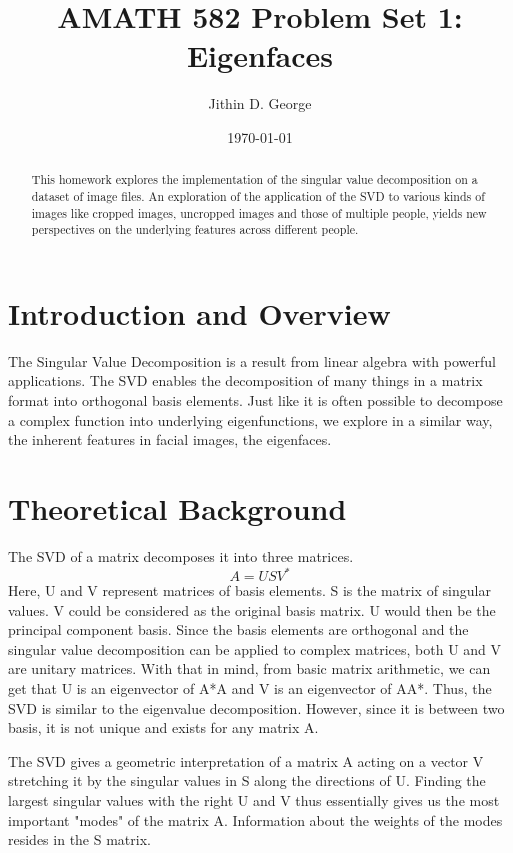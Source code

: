 \documentclass[a4paper]{article}
\title{AMATH 582 Problem Set 1: Eigenfaces}
\author{Jithin D. George}
\date{\today}
\begin{document}
\maketitle

\begin{abstract}
This homework explores the implementation of the singular value decomposition on a dataset of image files. An exploration of the application of the SVD to various kinds of images like cropped images, uncropped images and those of multiple people, yields new perspectives on the underlying features across different people.
\end{abstract}

\section{Introduction and Overview}
\label{sec:introduction}

The Singular Value Decomposition is a result from linear algebra with powerful applications. The SVD enables the decomposition of many things in a matrix format into orthogonal basis elements. Just like it is often possible to decompose a complex function into underlying eigenfunctions, we explore in a similar way, the inherent features in facial images, the eigenfaces.
 
\section{Theoretical Background}
\label{sec:theory}


The SVD of a matrix decomposes it into three matrices.
\[A=USV^{*} \]
Here, U and V represent matrices of basis elements. S is the matrix of singular values. V could be considered as the original basis matrix. U would then be the principal component basis. Since the basis elements are orthogonal and the singular value decomposition can be applied to complex matrices, both U and V are unitary matrices. With that in mind, from basic matrix arithmetic, we can get that U is an eigenvector of A*A and V is an eigenvector of AA*. Thus, the SVD is similar to the eigenvalue decomposition. However, since it is between two basis, it is not unique and exists for any matrix A.

The SVD gives a geometric interpretation of a matrix A acting on a vector V stretching it by the singular values in S along the directions of U. Finding the largest singular values with the right U and V thus essentially gives us the most important "modes" of the matrix A. Information about the weights of the modes resides in the S matrix.
\end{document}

